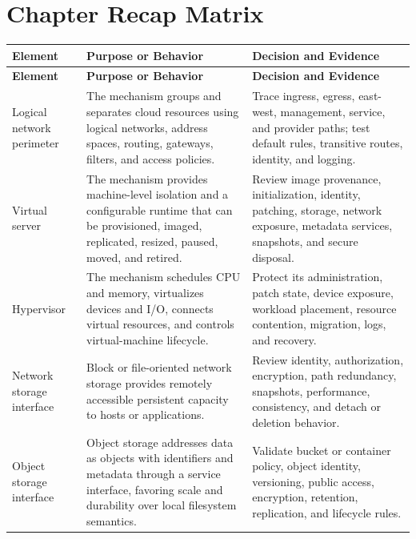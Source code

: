 \documentclass[11pt]{article}
\begin{document}
\section{Chapter Recap Matrix}
\begingroup\small\setlength{\tabcolsep}{4pt}
\begin{longtable}{@{}>{\RaggedRight\arraybackslash}p{}>{\RaggedRight\arraybackslash}p{}>{\RaggedRight\arraybackslash}p{}@{}}
\toprule\rowcolor{Navy}\color{white}\textbf{Element} & \color{white}\textbf{Purpose or Behavior} & \color{white}\textbf{Decision and Evidence}\\\midrule\endfirsthead
\toprule\rowcolor{Navy}\color{white}\textbf{Element} & \color{white}\textbf{Purpose or Behavior} & \color{white}\textbf{Decision and Evidence}\\\midrule\endhead
Logical network perimeter & The mechanism groups and separates cloud resources using logical networks, address spaces, routing, gateways, filters, and access policies. & Trace ingress, egress, east-west, management, service, and provider paths; test default rules, transitive routes, identity, and logging. \\\midrule
Virtual server & The mechanism provides machine-level isolation and a configurable runtime that can be provisioned, imaged, replicated, resized, paused, moved, and retired. & Review image provenance, initialization, identity, patching, storage, network exposure, metadata services, snapshots, and secure disposal. \\\midrule
Hypervisor & The mechanism schedules CPU and memory, virtualizes devices and I/O, connects virtual resources, and controls virtual-machine lifecycle. & Protect its administration, patch state, device exposure, workload placement, resource contention, migration, logs, and recovery. \\\midrule
Network storage interface & Block or file-oriented network storage provides remotely accessible persistent capacity to hosts or applications. & Review identity, authorization, encryption, path redundancy, snapshots, performance, consistency, and detach or deletion behavior. \\\midrule
Object storage interface & Object storage addresses data as objects with identifiers and metadata through a service interface, favoring scale and durability over local filesystem semantics. & Validate bucket or container policy, object identity, versioning, public access, encryption, retention, replication, and lifecycle rules. \\\midrule

\end{longtable}
\end{document}
